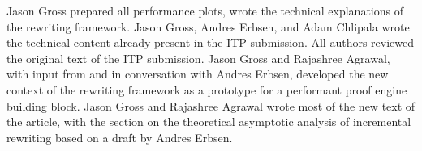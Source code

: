 \documentclass[sn-mathphys,pdflatex]{sn-jnl}%
\makeatletter
\renewcommand{\todo}[2][]{\tikzexternaldisable\@todo[#1]{#2}\tikzexternalenable}
\let\@badhref=\href
\renewcommand{\href}[2]{\@badhref{#2}{#1}}
\theoremstyle{thmstyleone}%
\theoremstyle{thmstyletwo}%
\theoremstyle{thmstylethree}%
\makeatother
\begin{document}
Jason Gross prepared all performance plots, wrote the technical explanations of the rewriting framework.
Jason Gross, Andres Erbsen, and Adam Chlipala wrote the technical content already present in the ITP submission.
All authors reviewed the original text of the ITP submission.
Jason Gross and Rajashree Agrawal, with input from and in conversation with Andres Erbsen, developed the new context of the rewriting framework as a prototype for a performant proof engine building block.
Jason Gross and Rajashree Agrawal wrote most of the new text of the article, with the section on the theoretical asymptotic analysis of incremental rewriting based on a draft by Andres Erbsen.


%
%
%
%


\nocite{Schropp2013}
\newcommand{\burl}[1]{{\edef\texttildelow{\detokenize{~}}\url{#1}}}

\end{document}
